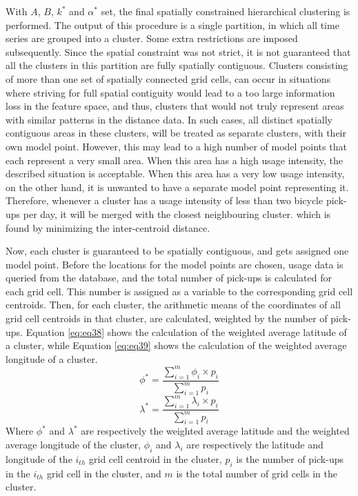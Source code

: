\documentclass[12pt,oneside]{reedthesis}
\begin{document}
With \(A\), \(B\), \(k^{*}\) and \(\alpha^{*}\) set, the final spatially
constrained hierarchical clustering is performed. The output of this
procedure is a single partition, in which all time series are grouped
into a cluster. Some extra restrictions are imposed subsequently. Since
the spatial constraint was not strict, it is not guaranteed that all the
clusters in this partition are fully spatially contiguous. Clusters
consisting of more than one set of spatially connected grid cells, can
occur in situations where striving for full spatial contiguity would
lead to a too large information loss in the feature space, and thus,
clusters that would not truly represent areas with similar patterns in
the distance data. In such cases, all distinct spatially contiguous
areas in these clusters, will be treated as separate clusters, with
their own model point. However, this may lead to a high number of model
points that each represent a very small area. When this area has a high
usage intensity, the described situation is acceptable. When this area
has a very low usage intensity, on the other hand, it is unwanted to
have a separate model point representing it. Therefore, whenever a
cluster has a usage intensity of less than two bicycle pick-ups per day,
it will be merged with the closest neighbouring cluster. which is found
by minimizing the inter-centroid distance.

Now, each cluster is guaranteed to be spatially contiguous, and gets
assigned one model point. Before the locations for the model points are
chosen, usage data is queried from the database, and the total number of
pick-ups is calculated for each grid cell. This number is assigned as a
variable to the corresponding grid cell centroids. Then, for each
cluster, the arithmetic means of the coordinates of all grid cell
centroids in that cluster, are calculated, weighted by the number of
pick-ups. Equation \eqref{eq:eq38} shows the calculation of the weighted
average latitude of a cluster, while Equation \eqref{eq:eq39} shows the
calculation of the weighted average longitude of a cluster.
\begin{equation}
\phi^{*} = \frac{\sum_{i=1}^{m} \phi_{i} \times p_{i}}{\sum_{i=1}^{m} p_{i}}
\label{eq:eq38}
\end{equation}\begin{equation}
\lambda^{*} = \frac{\sum_{i=1}^{m} \lambda_{i} \times p_{i}}{\sum_{i=1}^{m} p_{i}}
\label{eq:eq39}
\end{equation}
Where \(\phi^{*}\) and \(\lambda^{*}\) are respectively the weighted
average latitude and the weighted average longitude of the cluster,
\(\phi_i\) and \(\lambda_{i}\) are respectively the latitude and
longitude of the \(i_{th}\) grid cell centroid in the cluster, \(p_{i}\)
is the number of pick-ups in the \(i_{th}\) grid cell in the cluster,
and \(m\) is the total number of grid cells in the cluster.
\end{document}
